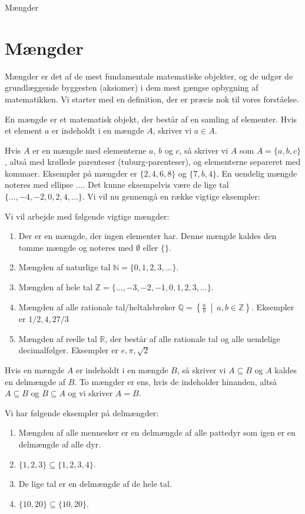 
\begin{center}
\Huge
Mængder
\end{center}

\section*{Mængder}
Mængder er det af de mest fundamentale matematiske objekter, og de udgør de grundlæggende byggesten (aksiomer) i dem mest gængse opbygning af matematikken. Vi starter med en definition, der er præcis nok til vores forståelse.
\begin{defn}
En mængde er et matematisk objekt, der består af en samling af elementer. Hvis et element $a$ er indeholdt i en mængde $A$, skriver vi $a\in A$.
\end{defn} 
Hvis $A$ er en mængde med elementerne $a$, $b$ og $c$, så skriver vi $A$ som $A= \{a,b,c\}$, altså med krøllede parenteser (tuburg-parenteser), og elementerne separeret med kommaer. Eksempler på mængder er $\{2,4,6,8\}$ og $\{7,b,4\}$. En uendelig mængde noteres med ellipse $\hdots$. Det kunne eksempelvis være de lige tal $\{\hdots,-4,-2,0,2,4,\hdots\}$. Vi vil nu gennemgå en række vigtige eksempler:
\begin{exa}
Vi vil arbejde med følgende vigtige mængder:
\begin{enumerate}[label=\roman*)]
\item Der er en mængde, der ingen elementer har. Denne mængde kaldes den tomme mængde og noteres med $\emptyset$ eller $\{\}$. 
\item Mængden af naturlige tal $\mathbb{N} = \{0,1,2,3,\hdots\}$.
\item Mængden af hele tal $\mathbb{Z} = \{\hdots,-3,-2,-1,0,1,2,3,\hdots \}$.
\item Mængden af alle rationale tal/heltalsbrøker $\mathbb{Q} = \left\{\frac{a}{b} \ \middle | \ a,b\in \mathbb{Z}\right\}$. Eksempler er $1/2, 4, 27/3$
\item Mængden af reelle tal $\mathbb{R}$, der består af alle rationale tal og alle uendelige decimalfølger. Eksempler er $e,\pi, \sqrt{2}$
\end{enumerate}
\end{exa}
Hvis en mængde $A$ er indeholdt i en mængde $B$, så skriver vi $A\subseteq B$ og $A$ kaldes en delmængde af $B$. To mængder er ens, hvis de indeholder hinanden, altså $A\subseteq B$ og $B\subseteq A$ og vi skriver $A=B$. 
\begin{exa}
Vi har følgende eksempler på delmængder:
\begin{enumerate}[label=\roman*)]
\item Mængden af alle mennesker er en delmængde af alle pattedyr som igen er en delmængde af alle dyr.
\item $\{1,2,3\} \subseteq \{1,2,3,4\}$.
\item De lige tal er en delmængde af de hele tal.  
\item $\{10,20\}\subseteq \{10,20\}$.
\end{enumerate}
\end{exa}

